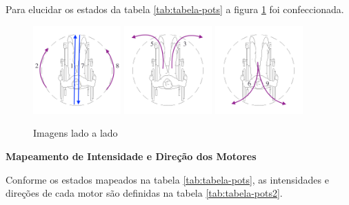   Para elucidar os estados da tabela \ref{tab:tabela-pots} a figura \ref{fig:estados} foi confeccionada.

  \begin{figure}[!ht]
    \center
    \includegraphics[width=0.3\textwidth]{figuras/resultados/estados_1_2_7_8}
    \includegraphics[width=0.3\textwidth]{figuras/resultados/estados_3_5}
    \includegraphics[width=0.3\textwidth]{figuras/resultados/estados_6_9}
    \caption{Imagens lado a lado}
    \label{fig:estados}
  \end{figure}

  \textbf{Mapeamento de Intensidade e Direção dos Motores}

    Conforme os estados mapeados na tabela \ref{tab:tabela-pots}, as intensidades e direções de cada motor são definidas na tabela \ref{tab:tabela-pots2}.

